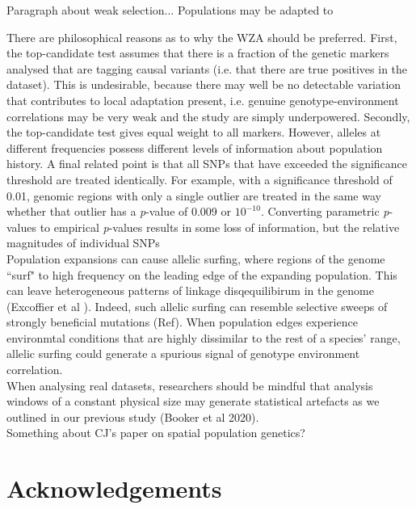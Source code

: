 \documentclass[11pt,twoside,lineno]{GSA_format}
\begin{document}
Paragraph about weak selection...
Populations may be adapted to 



There are philosophical reasons as to why the WZA should be preferred. First, the top-candidate test assumes that there is a fraction of the genetic markers analysed that are tagging causal variants (i.e. that there are true positives in the dataset). This is undesirable, because there may well be no detectable variation that contributes to local adaptation present, i.e. genuine genotype-environment correlations may be very weak and the study are simply underpowered. Secondly, the top-candidate test gives equal weight to all markers. However, alleles at different frequencies possess different levels of information about population history. A final related point is that all SNPs that have exceeded the significance threshold are treated identically. For example, with a significance threshold of 0.01, genomic regions with only a single outlier are treated in the same way whether that outlier has a \textit{p}-value of 0.009 or $10^{-10}$. Converting parametric \textit{p}-values to empirical \textit{p}-values results in some loss of information, but the relative magnitudes of individual SNPs  \\

Population expansions can cause allelic surfing, where regions of the genome ``surf" to high frequency on the leading edge of the expanding population. This can leave heterogeneous patterns of linkage disqequilibirum in the genome (Excoffier et al ). Indeed, such allelic surfing can resemble selective sweeps of strongly beneficial mutations (Ref). When population edges experience environmtal conditions that are highly dissimilar to the rest of a species' range, allelic surfing could generate a spurious signal of genotype environment correlation. \\ 


When analysing real datasets, researchers should be mindful that analysis windows of a constant physical size may generate statistical artefacts as we outlined in our previous study (Booker et al 2020). \\

Something about CJ's paper on spatial population genetics? \\

\section{Acknowledgements}
\end{document}
